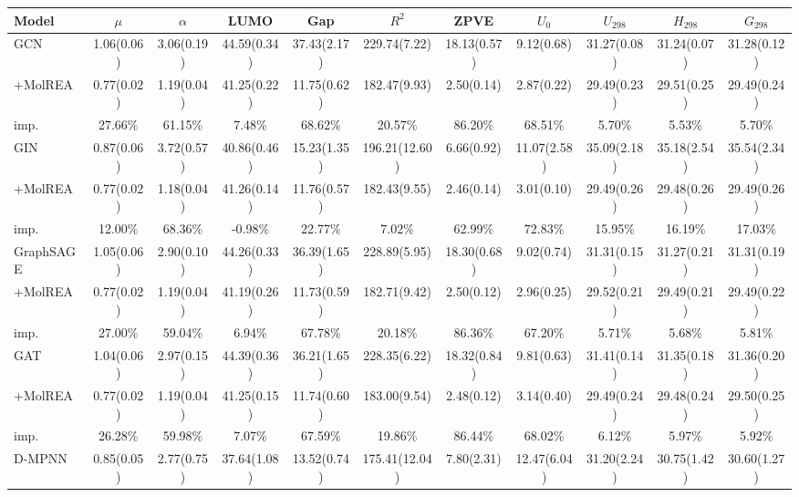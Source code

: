 \begin{table}[t]
\centering
{\small
\setlength{\tabcolsep}{2.2pt}
\begin{tabular}{l*{10}{c}}
\hline
Model & $\mu$ & $\alpha$ & LUMO & Gap & $R^2$ & ZPVE & $U_0$ & $U_{298}$ & $H_{298}$ & $G_{298}$ \\
\hline
GCN & 1.06(0.06) & 3.06(0.19) & 44.59(0.34) & 37.43(2.17) & 229.74(7.22) & 18.13(0.57) & 9.12(0.68) & 31.27(0.08) & 31.24(0.07) & 31.28(0.12) \\
+MolREA & 0.77(0.02) & 1.19(0.04) & 41.25(0.22) & 11.75(0.62) & 182.47(9.93) & 2.50(0.14) & 2.87(0.22) & 29.49(0.23) & 29.51(0.25) & 29.49(0.24) \\
imp. & 27.66\% & 61.15\% & 7.48\% & 68.62\% & 20.57\% & 86.20\% & 68.51\% & 5.70\% & 5.53\% & 5.70\% \\
\hline
GIN & 0.87(0.06) & 3.72(0.57) & 40.86(0.46) & 15.23(1.35) & 196.21(12.60) & 6.66(0.92) & 11.07(2.58) & 35.09(2.18) & 35.18(2.54) & 35.54(2.34) \\
+MolREA & 0.77(0.02) & 1.18(0.04) & 41.26(0.14) & 11.76(0.57) & 182.43(9.55) & 2.46(0.14) & 3.01(0.10) & 29.49(0.26) & 29.48(0.26) & 29.49(0.26) \\
imp. & 12.00\% & 68.36\% & -0.98\% & 22.77\% & 7.02\% & 62.99\% & 72.83\% & 15.95\% & 16.19\% & 17.03\% \\
\hline
GraphSAGE & 1.05(0.06) & 2.90(0.10) & 44.26(0.33) & 36.39(1.65) & 228.89(5.95) & 18.30(0.68) & 9.02(0.74) & 31.31(0.15) & 31.27(0.21) & 31.31(0.19) \\
+MolREA & 0.77(0.02) & 1.19(0.04) & 41.19(0.26) & 11.73(0.59) & 182.71(9.42) & 2.50(0.12) & 2.96(0.25) & 29.52(0.21) & 29.49(0.21) & 29.49(0.22) \\
imp. & 27.00\% & 59.04\% & 6.94\% & 67.78\% & 20.18\% & 86.36\% & 67.20\% & 5.71\% & 5.68\% & 5.81\% \\
\hline
GAT & 1.04(0.06) & 2.97(0.15) & 44.39(0.36) & 36.21(1.65) & 228.35(6.22) & 18.32(0.84) & 9.81(0.63) & 31.41(0.14) & 31.35(0.18) & 31.36(0.20) \\
+MolREA & 0.77(0.02) & 1.19(0.04) & 41.25(0.15) & 11.74(0.60) & 183.00(9.54) & 2.48(0.12) & 3.14(0.40) & 29.49(0.24) & 29.48(0.24) & 29.50(0.25) \\
imp. & 26.28\% & 59.98\% & 7.07\% & 67.59\% & 19.86\% & 86.44\% & 68.02\% & 6.12\% & 5.97\% & 5.92\% \\
\hline
D-MPNN & 0.85(0.05) & 2.77(0.75) & 37.64(1.08) & 13.52(0.74) & 175.41(12.04) & 7.80(2.31) & 12.47(6.04) & 31.20(2.24) & 30.75(1.42) & 30.60(1.27) \\

\end{tabular}}
\end{table}

